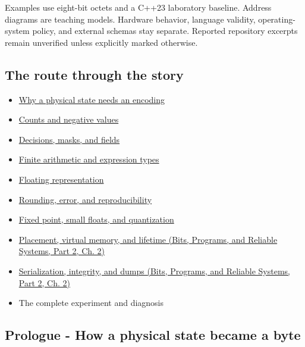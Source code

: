 Examples use eight-bit octets and a C++23 laboratory baseline. Address diagrams are teaching models. Hardware behavior, language validity, operating-system policy, and external schemas stay separate. Reported repository excerpts remain unverified unless explicitly marked otherwise.

\subsection{The route through the story}\label{01-foundations-i-ch001-the-route-through-the-story}

\hypertarget{01-foundations-i-ch001-the-route-through-the-story}{}

\begin{itemize}
\tightlist
\item
  \hyperref[01-foundations-i-ch001-prologue---how-a-physical-state-became-a-byte]{Why a physical state needs an encoding}
\item
  \hyperref[01-foundations-i-ch001-from-a-signal-to-an-interpretation]{Counts and negative values}
\item
  \hyperref[01-foundations-i-ch001-bits-become-decisions-and-compact-fields]{Decisions, masks, and fields}
\item
  \hyperref[01-foundations-i-ch001-arithmetic-becomes-a-policy]{Finite arithmetic and expression types}
\item
  \hyperref[01-foundations-i-ch001-a-stretching-ruler-for-real-valued-quantities]{Floating representation}
\item
  \hyperref[01-foundations-i-ch001-when-arithmetic-meets-uncertainty]{Rounding, error, and reproducibility}
\item
  \hyperref[01-foundations-i-ch001-choosing-what-information-to-keep]{Fixed point, small floats, and quantization}
\item
  \href{../01-Bits-Programs-and-Reliable-Systems-P02/main.pdf\#nameddest=01-foundations-i-ch002-where-the-bytes-live}{Placement, virtual memory, and lifetime (Bits, Programs, and Reliable Systems, Part 2, Ch. 2)}
\item
  \href{../01-Bits-Programs-and-Reliable-Systems-P02/main.pdf\#nameddest=01-foundations-i-ch002-bytes-become-a-durable-agreement}{Serialization, integrity, and dumps (Bits, Programs, and Reliable Systems, Part 2, Ch. 2)}
\item
  {The complete experiment and diagnosis}
\end{itemize}

\subsection{Prologue - How a physical state became a byte}\label{01-foundations-i-ch001-prologue---how-a-physical-state-became-a-byte}

